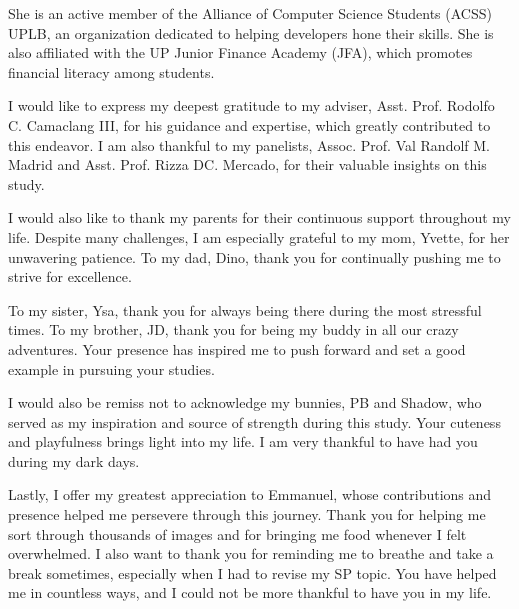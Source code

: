 \documentclass{icsthesis}
\begin{document}
\begin{frontmatter}
\begin{biosketch}
            She is an active member of the Alliance of Computer Science Students (ACSS) UPLB, an organization dedicated to helping developers hone their skills. She is also affiliated with the UP Junior Finance Academy (JFA), which promotes financial literacy among students.
			
			\addauthorsignaturefield
		\end{biosketch}	
		
		\begin{acknowledgement}
			I would like to express my deepest gratitude to my adviser, Asst. Prof. Rodolfo C. Camaclang III, for his guidance and expertise, which greatly contributed to this endeavor. I am also thankful to my panelists, Assoc. Prof. Val Randolf M. Madrid and Asst. Prof. Rizza DC. Mercado, for their valuable insights on this study.

            I would also like to thank my parents for their continuous support throughout my life. Despite many challenges, I am especially grateful to my mom, Yvette, for her unwavering patience. To my dad, Dino, thank you for continually pushing me to strive for excellence. 

            To my sister, Ysa, thank you for always being there during the most stressful times. To my brother, JD, thank you for being my buddy in all our crazy adventures. Your presence has inspired me to push forward and set a good example in pursuing your studies. 
            
            I would also be remiss not to acknowledge my bunnies, PB and Shadow, who served as my inspiration and source of strength during this study. Your cuteness and playfulness brings light into my life. I am very thankful to have had you during my dark days. 
            
            Lastly, I offer my greatest appreciation to Emmanuel, whose contributions and presence helped me persevere through this journey. Thank you for helping me sort through thousands of images and for bringing me food whenever I felt overwhelmed. I also want to thank you for reminding me to breathe and take a break sometimes, especially when I had to revise my SP topic. You have helped me in countless ways, and I could not be more thankful to have you in my life.
		\end{acknowledgement}
		
		\maketableofcontents
		
		\makelistoftables

		\makelistoffigures
	

\end{frontmatter}
\end{document}
